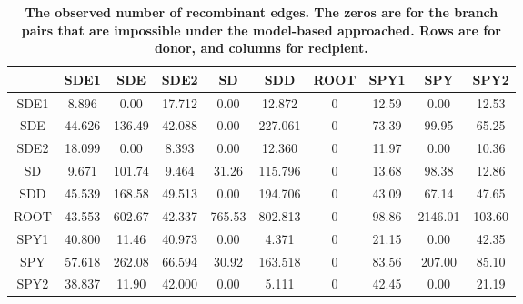 \documentclass[10pt]{article}
\providecommand{\tabularnewline}{\\}
\begin{document}
\begin{table}[!ht]
\caption{
\bf{The observed number of recombinant edges.}
The zeros are for the branch pairs that are impossible under the model-based
approached. Rows are for donor, and columns for recipient.}
\noindent \centering{}\begin{tabular}{cccccccccc}
\hline
& SDE1 & SDE & SDE2 & SD & SDD & ROOT & SPY1 & SPY & SPY2 \tabularnewline
\hline
SDE1&8.896 &  0.00 &17.712  & 0.00 & 12.872   & 0 &12.59  &  0.00  &12.53\tabularnewline
SDE &44.626& 136.49& 42.088 &  0.00& 227.061  &  0& 73.39 &  99.95 & 65.25\tabularnewline
SDE2&18.099&   0.00&  8.393 &  0.00&  12.360  &  0& 11.97 &   0.00 & 10.36\tabularnewline
SD  &9.671 &101.74 & 9.464  &31.26 &115.796   & 0 &13.68  & 98.38  &12.86\tabularnewline
SDD &45.539& 168.58& 49.513 &  0.00& 194.706  &  0& 43.09 &  67.14 & 47.65\tabularnewline
ROOT&43.553& 602.67& 42.337 &765.53& 802.813  &  0& 98.86 &2146.01 &103.60\tabularnewline
SPY1&40.800&  11.46& 40.973 &  0.00&   4.371  &  0& 21.15 &   0.00 & 42.35\tabularnewline
SPY &57.618& 262.08& 66.594 & 30.92& 163.518  &  0& 83.56 & 207.00 & 85.10\tabularnewline
SPY2&38.837&  11.90& 42.000 &  0.00&   5.111  &  0& 42.45 &   0.00 & 21.19\tabularnewline
\hline
\end{tabular}
\label{tab:obsheatmap}
\end{table}
\end{document}
